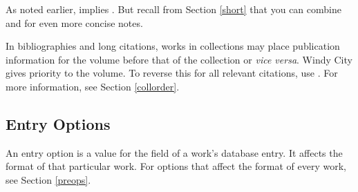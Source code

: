 \documentclass[11pt,letterpaper,oneside]{article}
\begin{document}
\begin{optionlist}
As noted earlier,  implies . But recall
from Section \ref{short} that you can combine  and
 for even more concise notes.


In bibliographies and long citations, works in collections may place
publication information for the volume before that of the collection
or \textit{vice versa}. Windy City gives priority to the volume. To
reverse this for all relevant citations, use . For more
information, see Section \ref{collorder}.

\end{optionlist}

\subsection{Entry Options}
\label{entryops}

An entry option is a value for the  field of a
work's database entry. It affects the format of that particular work.
For options that affect the format of every work, see Section
\ref{preops}.
\end{document}
